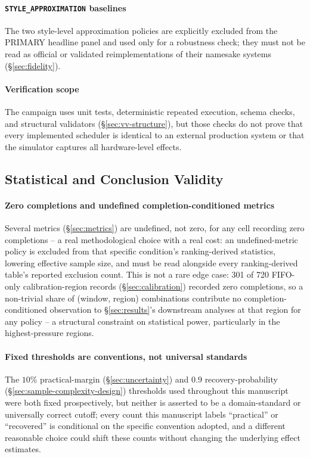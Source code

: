 \paragraph{\texttt{STYLE\_APPROXIMATION} baselines} The two style-level
approximation policies are explicitly excluded from the PRIMARY headline
panel and used only for a robustness check; they must not be read as
official or validated reimplementations of their namesake systems
(\S\ref{sec:fidelity}).

\paragraph{Verification scope} The campaign uses unit tests, deterministic
repeated execution, schema checks, and structural validators
(\S\ref{sec:vv-structure}), but those checks do not prove that every
implemented scheduler is identical to an external production system or that
the simulator captures all hardware-level effects.

\subsection{Statistical and Conclusion Validity}

\paragraph{Zero completions and undefined completion-conditioned
metrics} Several metrics (\S\ref{sec:metrics}) are undefined, not zero,
for any cell recording zero completions -- a real methodological choice
with a real cost: an undefined-metric policy is excluded from that
specific condition's ranking-derived statistics, lowering effective
sample size, and must be read alongside every ranking-derived table's
reported exclusion count. This is not a rare edge case: 301 of 720
FIFO-only calibration-region records (\S\ref{sec:calibration}) recorded
zero completions, so a non-trivial share of (window, region) combinations
contribute no completion-conditioned observation to \S\ref{sec:results}'s
downstream analyses at that region for any policy -- a structural
constraint on statistical power, particularly in the highest-pressure
regions.

\paragraph{Fixed thresholds are conventions, not universal standards} The
$10\%$ practical-margin (\S\ref{sec:uncertainty}) and $0.9$
recovery-probability (\S\ref{sec:sample-complexity-design}) thresholds used
throughout this manuscript were both fixed prospectively, but neither is
asserted to be a domain-standard or universally correct cutoff; every count
this manuscript labels ``practical'' or ``recovered'' is conditional on the
specific convention adopted, and a different reasonable choice could shift
these counts without changing the underlying effect estimates.

